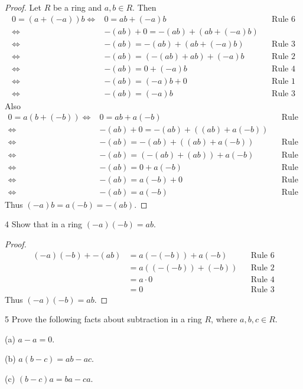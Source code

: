 \begin{proof}
    Let $R$ be a ring and $a, b \in R$. Then
    \begin{align*}
        0 = (a + (-a))b 
        \iff &0 = ab + (-a)b &&\text{Rule 6} \\
        \iff &-(ab) + 0 = -(ab) + (ab + (-a)b) \\
        \iff &-(ab) = -(ab) + (ab + (-a)b) &&\text{Rule 3} \\
        \iff &-(ab) = (-(ab) + ab) + (-a)b &&\text{Rule 2} \\
        \iff &-(ab) = 0 + (-a)b &&\text{Rule 4} \\
        \iff &-(ab) = (-a)b + 0 &&\text{Rule 1} \\
        \iff &-(ab) = (-a)b &&\text{Rule 3}
    \end{align*}
    Also
    \begin{align*}
        0 = a(b + (-b)) 
        \iff &0 = ab + a(-b) &&\text{Rule 6} \\
        \iff &-(ab) + 0 = -(ab) + ((ab) + a(-b))  \\
        \iff &-(ab) = -(ab) + ((ab) + a(-b)) &&\text{Rule 3} \\
        \iff &-(ab) = (-(ab) + (ab)) + a(-b) &&\text{Rule 2} \\
        \iff &-(ab) = 0 + a(-b) &&\text{Rule 4} \\
        \iff &-(ab) = a(-b) + 0 &&\text{Rule 1} \\
        \iff &-(ab) = a(-b) &&\text{Rule 3}
    \end{align*}
    Thus $(-a)b = a(-b) = -(ab)$.
\end{proof}

\begin{problem}{4}
    Show that in a ring $(-a)(-b) = ab$.
\end{problem}
\solved

\begin{proof}
    \begin{align*}
        (-a)(-b) + -(ab) &= a(-(-b)) + a(-b) && \text{Rule 6} \\
                        &= a((-(-b)) + (-b)) && \text{Rule 2} \\
                        &= a \cdot 0 && \text{Rule 4} \\
                        &= 0 && \text{Rule 3}
    \end{align*}
    Thus $(-a)(-b) = ab$.
\end{proof}

\begin{problem}{5}
    Prove the following facts about subtraction in a ring $R$,
    where $a, b, c \in R$.

    (a) $a - a = 0$.

    (b) $a(b - c) = ab - ac$.

    (c) $(b - c)a = ba - ca$.
\end{problem}
\solved

